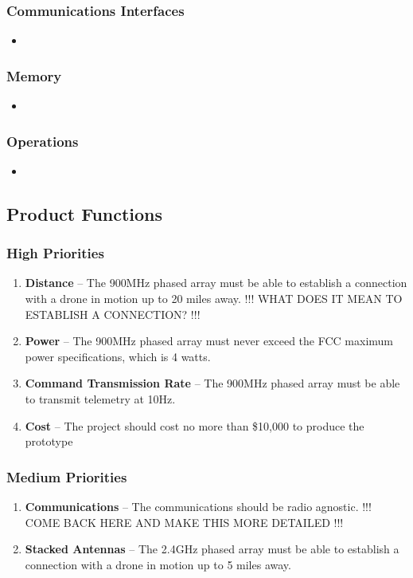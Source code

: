 \documentclass[ProjectRequirements.tex]{subfiles}
\begin{document}
		\subsubsection{Communications Interfaces}
			\begin{itemize}\itemsep1pt
				\item 
			\end{itemize}
			
		\subsubsection{Memory}
			\begin{itemize}\itemsep1pt
				\item 
			\end{itemize}
		
		\subsubsection{Operations}
			\begin{itemize}\itemsep1pt
				\item 
			\end{itemize}
		
	\subsection{Product Functions}
	
		\subsubsection{High Priorities}
			\begin{enumerate}
				\item \textbf{Distance} -- The 900MHz phased array must be able to establish a connection with a drone in motion up to 20 miles away. !!! WHAT DOES IT MEAN TO ESTABLISH A CONNECTION? !!!
				\item \textbf{Power} -- The 900MHz phased array must never exceed the FCC maximum power specifications, which is 4 watts.
				\item \textbf{Command Transmission Rate} -- The 900MHz phased array must be able to transmit telemetry at 10Hz.
				\item \textbf{Cost} -- The project should cost no more than \$10,000 to produce the prototype
							
			\end{enumerate}
		
		\subsubsection{Medium Priorities}
			\begin{enumerate}
				\item \textbf{Communications} -- The communications should be radio agnostic. !!! COME BACK HERE AND MAKE THIS MORE DETAILED !!!
				\item \textbf{Stacked Antennas} -- The 2.4GHz phased array must be able to establish a connection with a drone in motion up to 5 miles away.
			\end{enumerate}
		
\end{document}
